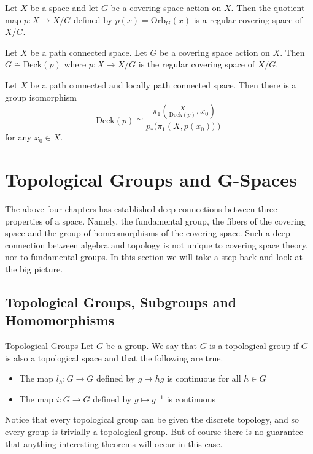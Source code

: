 \documentclass[a4paper]{article}
\begin{document}
\begin{prp}{}{} Let $X$ be a space and let $G$ be a covering space action on $X$. Then the quotient map $p:X\to X/G$ defined by $p(x)=\text{Orb}_G(x)$ is a regular covering space of $X/G$. 
\end{prp}

\begin{thm}{}{} Let $X$ be a path connected space. Let $G$ be a covering space action on $X$. Then $G\cong\text{Deck}(p)$ where $p:X\to X/G$ is the regular covering space of $X/G$. 
\end{thm}

\begin{crl}{}{} Let $X$ be a path connected and locally path connected space. Then there is a group isomorphism $$\text{Deck}(p)\cong\frac{\pi_1\left(\frac{X}{\text{Deck}(p)},x_0\right)}{p_\ast(\pi_1\left(X,p(x_0))\right)}$$ for any $x_0\in X$. 
\end{crl}

\pagebreak
\section{Topological Groups and G-Spaces}
The above four chapters has established deep connections between three properties of a space. Namely, the fundamental group, the fibers of the covering space and the group of homeomorphisms of the covering space. Such a deep connection between algebra and topology is not unique to covering space theory, nor to fundamental groups. In this section we will take a step back and look at the big picture. 

\subsection{Topological Groups, Subgroups and Homomorphisms}
\begin{defn}{Topological Groups}{} Let $G$ be a group. We say that $G$ is a topological group if $G$ is also a topological space and that the following are true. 
\begin{itemize}
\item The map $l_h:G\to G$ defined by $g\mapsto hg$ is continuous for all $h\in G$
\item The map $i:G\to G$ defined by $g\mapsto g^{-1}$ is continuous
\end{itemize}
\end{defn}

Notice that every topological group can be given the discrete topology, and so every group is trivially a topological group. But of course there is no guarantee that anything interesting theorems will occur in this case. 
\end{document}
